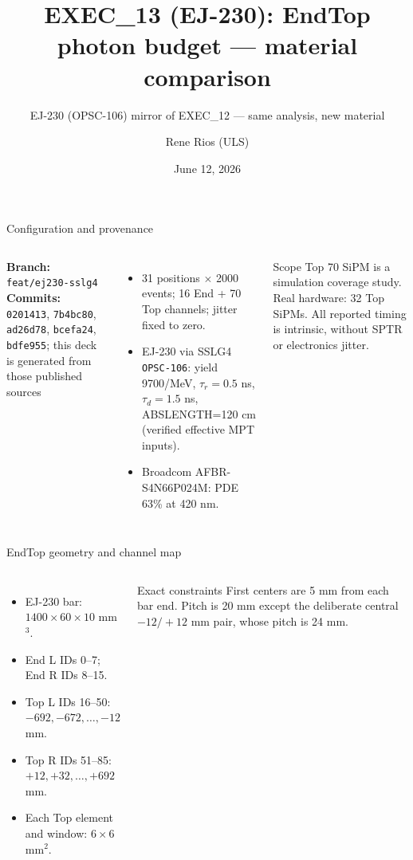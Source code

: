 \documentclass[aspectratio=169]{beamer}
\title{EXEC\_13 (EJ-230): EndTop photon budget --- material comparison}
\subtitle{EJ-230 (OPSC-106) mirror of EXEC\_12 --- same analysis, new material}
\author{Rene Rios (ULS)}
\date{June 12, 2026}
\begin{document}
\begin{frame}{Configuration and provenance}

\begin{columns}[T]
\textbf{Branch:} \texttt{feat/ej230-sslg4}\\
\textbf{Commits:} \texttt{0201413}, \texttt{7b4bc80}, \texttt{ad26d78},
\texttt{bcefa24}, \texttt{bdfe955}; this deck is generated from those published sources
\begin{itemize}\small
  \item 31 positions $\times$ 2000 events; 16 End + 70 Top channels; jitter fixed to zero.
  \item EJ-230 via SSLG4 \texttt{OPSC-106}: yield 9700/MeV, $\tau_r=0.5$ ns,
        $\tau_d=1.5$ ns, ABSLENGTH=120 cm (verified effective MPT inputs).
  \item Broadcom AFBR-S4N66P024M: PDE 63\% at 420 nm.
\end{itemize}
\begin{alertblock}{Scope}
Top 70 SiPM is a simulation coverage study. Real hardware: 32 Top SiPMs.
All reported timing is intrinsic, without SPTR or electronics jitter.
\end{alertblock}
\end{columns}

\end{frame}
\begin{frame}{EndTop geometry and channel map}

\begin{columns}[T]
\begin{itemize}
 \item EJ-230 bar: $1400\times60\times10$ mm$^3$.
 \item End L IDs 0--7; End R IDs 8--15.
 \item Top L IDs 16--50: $-692,-672,\ldots,-12$ mm.
 \item Top R IDs 51--85: $+12,+32,\ldots,+692$ mm.
 \item Each Top element and window: $6\times6$ mm$^2$.
\end{itemize}
\begin{block}{Exact constraints}
First centers are 5 mm from each bar end. Pitch is 20 mm except the deliberate
central $-12/+12$ mm pair, whose pitch is 24 mm.
\end{block}
\end{columns}

\end{frame}
\end{document}
